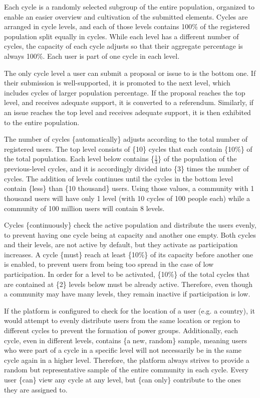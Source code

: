 \documentclass[a4paper,11pt]{article}
\begin{document}
\begin{multicols}{2}
Each cycle is a randomly selected subgroup of the entire population, organized to enable an easier overview and cultivation of the submitted elements. Cycles are arranged in cycle levels, and each of those levels contains 100\% of the registered population split equally in cycles. While each level has a different number of cycles, the capacity of each cycle adjusts so that their aggregate percentage is always 100\%. Each user is part of one cycle in each level.

The only cycle level a user can submit a proposal or issue to is the bottom one. If their submission is well-supported, it is promoted to the next level, which includes cycles of larger population percentage. If the proposal reaches the top level, and receives adequate support, it is converted to a referendum. Similarly, if an issue reaches the top level and receives adequate support, it is then exhibited to the entire population.

The number of cycles \{automatically\} adjusts according to the total number of registered users. The top level consists of \{10\} cycles that each contain \{10\%\} of the total population. Each level below contains \{$\frac{1}{3}$\} of the population of the previous-level cycles, and it is accordingly divided into \{3\} times the number of cycles. The addition of levels continues until the cycles in the bottom level contain \{less\} than \{10 thousand\} users. Using those values, a community with 1 thousand users will have only 1 level (with 10 cycles of 100 people each) while a community of 100 million users will contain 8 levels.

Cycles \{continuously\} check the active population and distribute the users evenly, to prevent having one cycle being at capacity and another one empty. Both cycles and their levels, are not active by default, but they activate as participation increases. A cycle \{must\} reach at least \{10\%\} of its capacity before another one is enabled, to prevent users from being too spread in the case of low participation. In order for a level to be activated, \{10\%\} of the total cycles that are contained at \{2\} levels below must be already active. Therefore, even though a community may have many levels, they remain inactive if participation is low.

If the platform is configured to check for the location of a user (e.g. a country), it would attempt to evenly distribute users from the same location or region to different cycles to prevent the formation of power groups. Additionally, each cycle, even in different levels, contains \{a new, random\} sample, meaning users who were part of a cycle in a specific level will not necessarily be in the same cycle again in a higher level. Therefore, the platform always strives to provide a random but representative sample of the entire community in each cycle. Every user \{can\} view any cycle at any level, but \{can only\} contribute to the ones they are assigned to.


\end{multicols}
\end{document}
